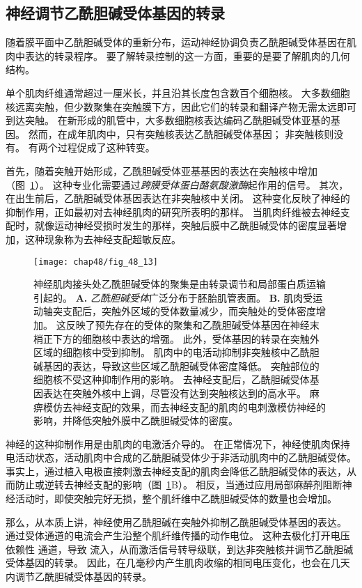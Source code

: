 \subsection{神经调节乙酰胆碱受体基因的转录}

随着膜平面中乙酰胆碱受体的重新分布，运动神经协调负责乙酰胆碱受体基因在肌肉中表达的转录程序。
要了解转录控制的这一方面，重要的是要了解肌肉的几何结构。


单个肌肉纤维通常超过一厘米长，并且沿其长度包含数百个细胞核。
大多数细胞核远离突触，但少数聚集在突触膜下方，因此它们的转录和翻译产物无需太远即可到达突触。
在新形成的肌管中，大多数细胞核表达编码乙酰胆碱受体亚基的基因。
然而，在成年肌肉中，只有突触核表达乙酰胆碱受体基因；
非突触核则没有。
有两个过程促成了这种转变。


首先，随着突触开始形成，乙酰胆碱受体亚基基因的表达在突触核中增加（图~\ref{fig:48_13}）。
这种专业化需要通过\textit{跨膜受体蛋白酪氨酸激酶}起作用的信号。
其次，在出生前后，乙酰胆碱受体基因表达在非突触核中关闭。
这种变化反映了神经的抑制作用，正如最初对去神经肌肉的研究所表明的那样。
当肌肉纤维被去神经支配时，就像运动神经受损时发生的那样，突触后膜中乙酰胆碱受体的密度显著增加，这种现象称为去神经支配超敏反应。


\begin{figure}[htbp]
	\centering
	\texttt{[image: chap48/fig\_48\_13]}
	\caption{神经肌肉接头处乙酰胆碱受体的聚集是由转录调节和局部蛋白质运输引起的。
		\textbf{A.} \textit{乙酰胆碱受体}广泛分布于胚胎肌管表面。
		\textbf{B.} 肌肉受运动轴突支配后，突触外区域的受体数量减少，而突触处的受体密度增加。
		这反映了预先存在的受体的聚集和乙酰胆碱受体基因在神经末梢正下方的细胞核中表达的增强。
		此外，受体基因的转录在突触外区域的细胞核中受到抑制。
		肌肉中的电活动抑制非突触核中乙酰胆碱基因的表达，导致这些区域乙酰胆碱受体密度降低。
		突触部位的细胞核不受这种抑制作用的影响。
		去神经支配后，乙酰胆碱受体基因表达在突触外核中上调，尽管没有达到突触核达到的高水平。
		麻痹模仿去神经支配的效果，而去神经支配的肌肉的电刺激模仿神经的影响，并降低突触外膜中乙酰胆碱受体的密度。}
	\label{fig:48_13}
\end{figure}


神经的这种抑制作用是由肌肉的电激活介导的。
在正常情况下，神经使肌肉保持电活动状态，活动肌肉中合成的乙酰胆碱受体少于非活动肌肉中的乙酰胆碱受体。
事实上，通过植入电极直接刺激去神经支配的肌肉会降低乙酰胆碱受体的表达，从而防止或逆转去神经支配的影响（图~\ref{fig:48_13}B）。
相反，当通过应用局部麻醉剂阻断神经活动时，即使突触完好无损，整个肌纤维中乙酰胆碱受体的数量也会增加。


那么，从本质上讲，神经使用乙酰胆碱在突触外抑制乙酰胆碱受体基因的表达。
通过受体通道的电流会产生沿整个肌纤维传播的动作电位。
这种去极化打开电压依赖性  通道，导致  流入，从而激活信号转导级联，到达非突触核并调节乙酰胆碱受体基因的转录。
因此，在几毫秒内产生肌肉收缩的相同电压变化，也会在几天内调节乙酰胆碱受体基因的转录。


